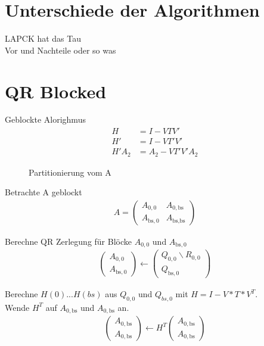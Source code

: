 \section{Unterschiede der Algorithmen}
LAPCK hat das Tau \\
Vor und Nachteile oder so was

\section{QR Blocked}
Geblockte Alorighmus
\begin{align}
H &= I - VTV'\\
H' &= I - VT'V'\\ 
H'A_2 &= A_2 - VT'V'A_2
\end{align}

\begin{figure} 
	
	\caption{Partitionierung vom A}
	\label{fig:patrA}
\end{figure}





Betrachte A geblockt
\begin{align}
	A = \left(\begin{array}{l|l}
	A_{0, 0} & A_{0, \text{bs}} \\ \hline
	A_{\text{bs}, 0}   & A_{\text{bs}, \text{bs}} 	
	\end{array} \right) 
\end{align}

Berechne QR Zerlegung für Blöcke $A_{0, 0}$ und $ A_{\text{bs},0}$
\begin{align}
	\left(\begin{array}{l} 
	A_{0, 0} \\ \hline
	A_{\text{bs}, 0}
	\end{array}\right)
	\leftarrow
	\left(\begin{array}{l} 
	Q_{0, 0}  \backslash R_{0,0} \\ \hline
	Q_{\text{bs}, 0} 
	\end{array}\right)
\end{align}

Berechne $H(0)$...$H(bs)$ aus $Q_{0, 0}$ und $Q_{bs, 0}$ mit $H = I - V*T*V^T$.\\
Wende $H^T$ auf $A_{0, \text{bs}}$ und $ A_{0,\text{bs}}$ an.
\begin{align}
	\left(\begin{array}{l} 
	A_{0, \text{bs}} \\ \hline
	A_{0, \text{bs}}
	\end{array}\right)
	\leftarrow
	H^T \left(\begin{array}{l} 
	A_{0, \text{bs}} \\ \hline
	A_{0, \text{bs}}
	\end{array}\right)
\end{align}



